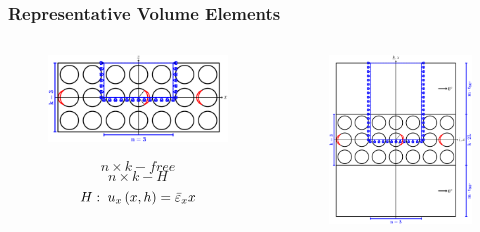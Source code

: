 \documentclass[first,firstsupp,lastsupp,last,hyperref,table]{ETHclass}
\begin{document}
\begin{frame}
\frametitle{\vspace{0.2cm}\small Representative Volume Elements}
\vspace{-1cm}
\centering
\begin{columns}[c]
\begin{column}{0.55\textwidth}
\centering
\begin{figure}
\centering
\includegraphics[width=\columnwidth]{freeThickPly.pdf}
\end{figure}
\vspace{-0.25cm}
\begin{equation*}
n\times k-free
\end{equation*}
\begin{equation*}
n\times k-H
\end{equation*}
\begin{equation*}
\scriptsize
H:\ u_{x}\left(x,h\right)=\bar{\varepsilon}_{x}x
\end{equation*}
\end{column}
\begin{column}{0.45\textwidth}
\centering
\begin{figure}
\centering
\includegraphics[width=\columnwidth]{ThickPly.pdf}

\end{figure}
\end{column}
\end{columns}
\end{frame}
\end{document}

